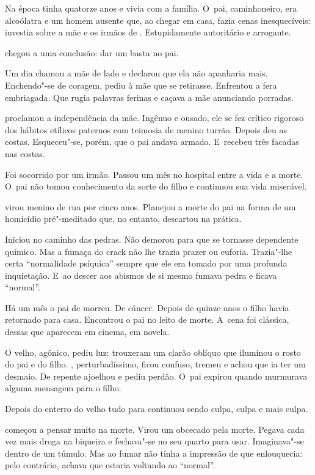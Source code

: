  

Na época  tinha quatorze anos e vivia com a família. O~pai,
caminhoneiro, era alcoólatra e um homem ausente que, ao chegar em casa,
fazia cenas inesquecíveis: investia sobre a mãe e os irmãos de .
Estupidamente autoritário e arrogante.

 chegou a uma conclusão: dar um basta no pai.

Um dia chamou a mãe de lado e declarou que ela não apanharia mais.
Enchendo"-se de coragem, pediu à mãe que se retirasse. Enfrentou a fera
embriagada. Que rugia palavras ferinas e caçava a mãe anunciando
porradas.

 proclamou a independência da mãe. Ingênuo e ousado, ele se fez
crítico rigoroso dos hábitos etílicos paternos com teimosia de menino
turrão. Depois deu as costas. Esqueceu"-se, porém, que o pai andava
armado. E~recebeu três facadas nas costas.

Foi socorrido por um irmão. Passou um mês no hospital entre a vida e a
morte. O~pai não tomou conhecimento da sorte do filho e continuou sua
vida miserável.

 virou menino de rua por cinco anos. Planejou a morte do pai na forma
de um homicídio pré"-meditado que, no entanto, descartou na prática.

Iniciou no caminho das pedras. Não demorou para que se tornasse
dependente químico. Mas a fumaça do crack não lhe trazia prazer ou
euforia. Trazia"-lhe certa ``normalidade psíquica'' sempre que ele era
tomado por uma profunda inquietação. E~ao descer aos abismos de si mesmo
fumava pedra e ficava ``normal''.

\asterisc{}

Há um mês o pai de  morreu. De câncer. Depois de quinze anos o filho
havia retornado para casa. Encontrou o pai no leito de morte. A~cena foi
clássica, dessas que aparecem em cinema, em novela.

O velho, agônico, pediu luz: trouxeram um clarão oblíquo que iluminou o
rosto do pai e do filho. , perturbadíssimo, ficou confuso, tremeu e
achou que ia ter um desmaio. De repente ajoelhou e pediu perdão. O~pai
expirou quando murmurava alguma mensagem para o filho.

\asterisc{}

Depois do enterro do velho tudo para  continuou sendo culpa, culpa e
mais culpa.

 começou a pensar muito na morte. Virou um obcecado pela morte. Pegava
cada vez mais droga na biqueira e fechava"-se no seu quarto para usar.
Imaginava"-se dentro de um túmulo. Mas ao fumar não tinha a impressão de
que enlouquecia: pelo contrário, achava que estaria voltando ao
``normal''.


